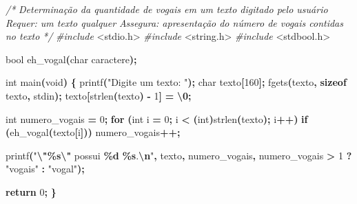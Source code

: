 \documentclass[
  11pt,
  a4paper,
]{scrbook}
\newenvironment{Shaded}{\begin{snugshade}}{\end{snugshade}}
\newcommand{\CharTok}[1]{\textcolor[rgb]{0.31,0.60,0.02}{#1}}
\newcommand{\CommentTok}[1]{\textcolor[rgb]{0.56,0.35,0.01}{\textit{#1}}}
\newcommand{\ControlFlowTok}[1]{\textcolor[rgb]{0.13,0.29,0.53}{\textbf{#1}}}
\newcommand{\DataTypeTok}[1]{\textcolor[rgb]{0.13,0.29,0.53}{#1}}
\newcommand{\DecValTok}[1]{\textcolor[rgb]{0.00,0.00,0.81}{#1}}
\newcommand{\ImportTok}[1]{#1}
\newcommand{\KeywordTok}[1]{\textcolor[rgb]{0.13,0.29,0.53}{\textbf{#1}}}
\newcommand{\NormalTok}[1]{#1}
\newcommand{\OperatorTok}[1]{\textcolor[rgb]{0.81,0.36,0.00}{\textbf{#1}}}
\newcommand{\PreprocessorTok}[1]{\textcolor[rgb]{0.56,0.35,0.01}{\textit{#1}}}
\newcommand{\SpecialCharTok}[1]{\textcolor[rgb]{0.81,0.36,0.00}{\textbf{#1}}}
\newcommand{\StringTok}[1]{\textcolor[rgb]{0.31,0.60,0.02}{#1}}
\begin{document}
\begin{Shaded}
\begin{Highlighting}[]
\CommentTok{/*}
\CommentTok{Determinação da quantidade de vogais em um texto digitado pelo usuário}
\CommentTok{Requer: um texto qualquer}
\CommentTok{Assegura: apresentação do número de vogais contidas no texto}
\CommentTok{*/}
\PreprocessorTok{\#include }\ImportTok{\textless{}stdio.h\textgreater{}}
\PreprocessorTok{\#include }\ImportTok{\textless{}string.h\textgreater{}}
\PreprocessorTok{\#include }\ImportTok{\textless{}stdbool.h\textgreater{}}

\DataTypeTok{bool}\NormalTok{ eh\_vogal}\OperatorTok{(}\DataTypeTok{char}\NormalTok{ caractere}\OperatorTok{);}

\DataTypeTok{int}\NormalTok{ main}\OperatorTok{(}\DataTypeTok{void}\OperatorTok{)} \OperatorTok{\{}
\NormalTok{    printf}\OperatorTok{(}\StringTok{"Digite um texto: "}\OperatorTok{);}
    \DataTypeTok{char}\NormalTok{ texto}\OperatorTok{[}\DecValTok{160}\OperatorTok{];}
\NormalTok{    fgets}\OperatorTok{(}\NormalTok{texto}\OperatorTok{,} \KeywordTok{sizeof}\NormalTok{ texto}\OperatorTok{,}\NormalTok{ stdin}\OperatorTok{);}
\NormalTok{    texto}\OperatorTok{[}\NormalTok{strlen}\OperatorTok{(}\NormalTok{texto}\OperatorTok{)} \OperatorTok{{-}} \DecValTok{1}\OperatorTok{]} \OperatorTok{=} \CharTok{\textquotesingle{}}\SpecialCharTok{\textbackslash{}0}\CharTok{\textquotesingle{}}\OperatorTok{;}

    \DataTypeTok{int}\NormalTok{ numero\_vogais }\OperatorTok{=} \DecValTok{0}\OperatorTok{;}
    \ControlFlowTok{for} \OperatorTok{(}\DataTypeTok{int}\NormalTok{ i }\OperatorTok{=} \DecValTok{0}\OperatorTok{;}\NormalTok{ i }\OperatorTok{\textless{}} \OperatorTok{(}\DataTypeTok{int}\OperatorTok{)}\NormalTok{strlen}\OperatorTok{(}\NormalTok{texto}\OperatorTok{);}\NormalTok{ i}\OperatorTok{++)}
        \ControlFlowTok{if} \OperatorTok{(}\NormalTok{eh\_vogal}\OperatorTok{(}\NormalTok{texto}\OperatorTok{[}\NormalTok{i}\OperatorTok{]))}
\NormalTok{            numero\_vogais}\OperatorTok{++;}

\NormalTok{    printf}\OperatorTok{(}\StringTok{"}\SpecialCharTok{\textbackslash{}"\%s\textbackslash{}"}\StringTok{ possui }\SpecialCharTok{\%d}\StringTok{ }\SpecialCharTok{\%s}\StringTok{.}\SpecialCharTok{\textbackslash{}n}\StringTok{"}\OperatorTok{,}\NormalTok{ texto}\OperatorTok{,}\NormalTok{ numero\_vogais}\OperatorTok{,}
\NormalTok{           numero\_vogais }\OperatorTok{\textgreater{}} \DecValTok{1} \OperatorTok{?} \StringTok{"vogais"} \OperatorTok{:} \StringTok{"vogal"}\OperatorTok{);}

    \ControlFlowTok{return} \DecValTok{0}\OperatorTok{;}
\OperatorTok{\}}
\end{Highlighting}
\end{Shaded}
\end{document}
